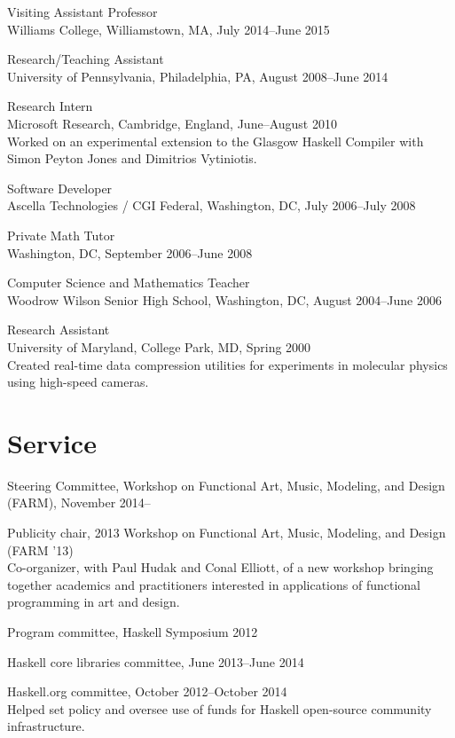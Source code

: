 \documentclass[12pt]{article}
\newcommand{\cvitem}{\par\hangpara{2em}{1}}
\begin{document}
\cvitem
Visiting Assistant Professor \\
Williams College, Williamstown, MA, July 2014--June 2015

\cvitem
Research/Teaching Assistant \\
University of Pennsylvania, Philadelphia, PA, August 2008--June 2014

\cvitem
Research Intern \\
Microsoft Research, Cambridge, England, June--August 2010 \\
Worked on an experimental extension to the Glasgow Haskell Compiler with
Simon Peyton Jones and Dimitrios Vytiniotis.

\cvitem
Software Developer \\
Ascella Technologies / CGI Federal, Washington,
DC, July 2006--July 2008

\cvitem
Private Math Tutor \\
Washington, DC, September 2006--June 2008

\cvitem
Computer Science and Mathematics Teacher \\
Woodrow Wilson Senior High School, Washington, DC, August 2004--June 2006

\cvitem
Research Assistant \\
University of Maryland, College Park, MD, Spring 2000 \\
Created real-time data compression utilities for experiments in
molecular physics using high-speed cameras.

\section*{Service}
\cvitem Steering Committee, Workshop on Functional Art, Music,
Modeling, and Design (FARM), November 2014--

\cvitem Publicity chair, 2013 Workshop on Functional Art, Music,
  Modeling, and Design (FARM '13) \\
  Co-organizer, with Paul Hudak and Conal Elliott, of a new workshop
  bringing together academics and practitioners interested in
  applications of functional programming in art and design.

\cvitem Program committee, Haskell Symposium 2012

\cvitem Haskell core libraries committee, June 2013--June 2014

\cvitem Haskell.org committee, October 2012--October 2014 \\
Helped set policy and oversee use of funds for Haskell open-source
community infrastructure.
\end{document}
